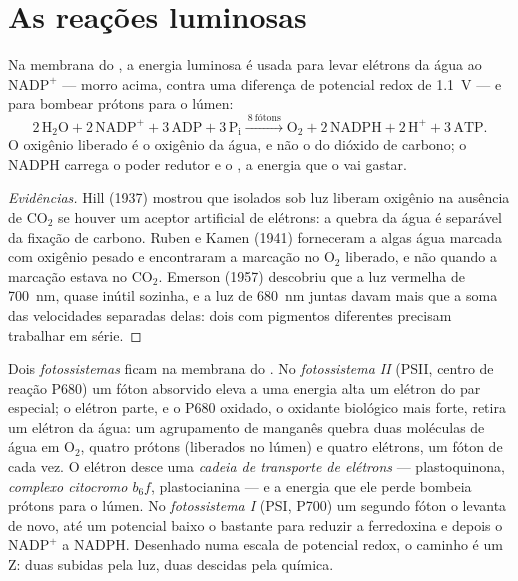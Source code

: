 \section{As reações luminosas}

\begin{proposition}\label{prop:b1:photosynthesis:lightreactions}
Na membrana do , a energia luminosa é usada para levar elétrons
da água ao $\mathrm{NADP^+}$ --- morro acima, contra uma diferença de
potencial redox de \qty{1.1}{V} --- e para bombear prótons para o lúmen:
\[
2\,\mathrm{H_2O} + 2\,\mathrm{NADP^+} + 3\,\mathrm{ADP} + 3\,\mathrm{P_i}
\xrightarrow{\ 8\ \text{fótons}\ }
\mathrm{O_2} + 2\,\mathrm{NADPH} + 2\,\mathrm{H^+} + 3\,\mathrm{ATP} .
\]
O oxigênio liberado é o oxigênio da água, e não o do dióxido de carbono;
o NADPH carrega o poder redutor e o , a energia que o 
vai gastar.
\end{proposition}
\begin{proof}[Evidências]
Hill (1937) mostrou que  isolados sob luz liberam oxigênio
na ausência de $\mathrm{CO_2}$ se houver um aceptor artificial de
elétrons: a quebra da água é separável da fixação de carbono. Ruben e
Kamen (1941) forneceram a algas água marcada com oxigênio pesado e
encontraram a marcação no $\mathrm{O_2}$ liberado, e não quando a
marcação estava no $\mathrm{CO_2}$. Emerson (1957) descobriu que a luz
vermelha de \qty{700}{nm}, quase inútil sozinha, e a luz de
\qty{680}{nm} juntas davam mais que a soma das velocidades separadas
delas: dois  com pigmentos diferentes precisam trabalhar em
série.
\end{proof}

\begin{definition}\label{def:b1:photosynthesis:zscheme}
Dois \emph{fotossistemas} ficam na membrana do . No
\emph{fotossistema II} (PSII, centro de reação P680) um fóton absorvido
eleva a uma energia alta um elétron do par especial; o elétron parte, e
o P680 oxidado, o oxidante biológico mais forte, retira um elétron da
água: um agrupamento de manganês quebra duas moléculas de água em
$\mathrm{O_2}$, quatro prótons (liberados no lúmen) e quatro elétrons,
um fóton de cada vez. O elétron desce uma
\emph{cadeia de transporte de elétrons} --- plastoquinona,
\emph{complexo citocromo $b_6f$}, plastocianina --- e a energia que ele
perde bombeia prótons para o lúmen. No \emph{fotossistema I} (PSI, P700)
um segundo fóton o levanta de novo, até um potencial baixo o bastante
para reduzir a ferredoxina e depois o $\mathrm{NADP^+}$ a NADPH.
Desenhado numa escala de potencial redox, o caminho é um Z: duas subidas
pela luz, duas descidas pela química.
\end{definition}


